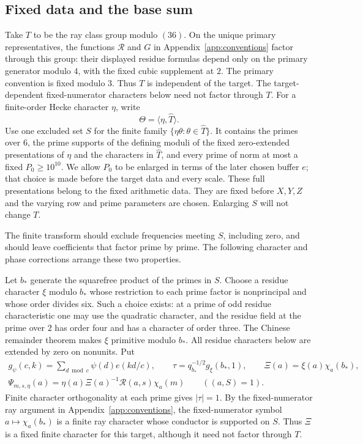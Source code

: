 \documentclass[12pt]{article}
\begin{document}
\subsection{Fixed data and the base sum}
Take \(T\) to be the ray class group modulo \((36)\).
On the unique primary representatives, the functions
\(\mathcal R\) and \(G\) in Appendix~\ref{app:conventions}
factor through this group: their displayed residue formulas depend
only on the primary generator modulo \(4\), with the fixed cubic
supplement at \(2\).  The primary convention is fixed modulo \(3\).
Thus \(T\) is independent of the target.  The target-dependent
fixed-numerator characters below need not factor through $T$.  For a
finite-order Hecke character $\eta$, write
\[
 \Theta=\langle\eta,\widehat T\rangle.
\]
Use one excluded set $S$ for the finite family
$\{\eta\theta:\theta\in\widehat T\}$.  It contains the primes over
$6$, the prime supports of the defining moduli of the fixed
zero-extended presentations of $\eta$ and the characters in
$\widehat T$, and every prime of norm at most a fixed $P_0\ge10^{10}$.
We allow $P_0$ to be enlarged in terms of the later chosen buffer $e$;
that choice is made before the target data and every scale.  These
full presentations belong to the fixed arithmetic data.  They are fixed
before $X,Y,Z$ and the varying row and prime parameters are chosen.
Enlarging $S$ will not change $T$.

The finite transform should exclude frequencies meeting $S$, including
zero, and should leave coefficients that factor prime by prime. The
following character and phase corrections arrange these two properties.

Let $b_*$ generate the squarefree product of the primes in $S$.
Choose a residue character $\xi$ modulo $b_*$ whose restriction to
each prime factor is nonprincipal and whose order divides six.  Such
a choice exists: at a prime of odd residue characteristic one may
use the quadratic character, and the residue field at the prime over
$2$ has order four and has a character of order three.  The Chinese
remainder theorem makes $\xi$ primitive modulo $b_*$.  All residue
characters below are extended by zero on nonunits.  Put
\[
 \begin{gathered}
 g_\psi(c,k)=\sum_{d\bmod c}\psi(d)e(kd/c),\qquad
 \tau=q_{b_*}^{-1/2}g_\xi(b_*,1),\qquad
 \Xi(a)=\xi(a)\chi_a(b_*),\\
 \Psi_{m,s,\eta}(a)=
       \eta(a)\Xi(a)^{-1}\mathcal R(a,s)\chi_a(m)
       \qquad ((a,S)=1).
 \end{gathered}
\]
Finite character orthogonality at each prime gives $|\tau|=1$.
By the fixed-numerator ray argument in Appendix~\ref{app:conventions}, the fixed-numerator symbol
$a\mapsto\chi_a(b_*)$ is a finite ray character whose conductor is
supported on $S$.  Thus $\Xi$ is a fixed finite character for this
target, although it need not factor through $T$.
\end{document}
